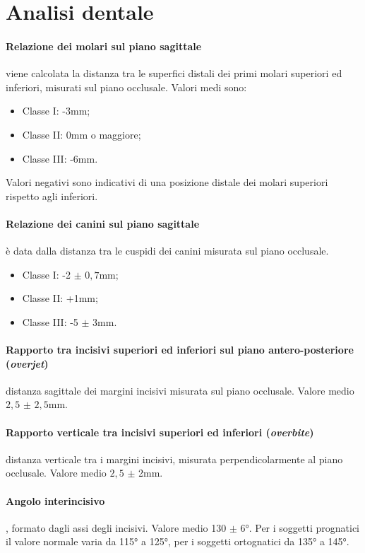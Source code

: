 \section{Analisi dentale}

\paragraph{Relazione dei molari sul piano sagittale} viene calcolata la distanza tra le superfici distali dei primi molari superiori ed inferiori, misurati sul piano occlusale. Valori medi sono:
\begin{itemize}
\item Classe I: -3mm;
\item Classe II: 0mm o maggiore;
\item Classe III: -6mm.
\end{itemize}

Valori negativi sono indicativi di una posizione distale dei molari superiori rispetto agli inferiori.

\paragraph{Relazione dei canini sul piano sagittale} è data dalla distanza tra le cuspidi dei canini misurata sul piano occlusale.
\begin{itemize}
\item Classe I: -2 $\pm$ $0,7$mm;
\item Classe II: +1mm;
\item Classe III: -5 $\pm$ 3mm.
\end{itemize}

\paragraph{Rapporto tra incisivi superiori ed inferiori sul piano antero-posteriore (\textit{overjet})} distanza sagittale dei margini incisivi misurata sul piano occlusale. Valore medio $2,5$ $\pm$ $2,5$mm.

\paragraph{Rapporto verticale tra incisivi superiori ed inferiori (\textit{overbite})} distanza verticale tra i margini incisivi, misurata perpendicolarmente al piano occlusale. Valore medio $2,5$ $\pm$ 2mm.

\paragraph{Angolo interincisivo}, formato dagli assi degli incisivi. Valore medio 130 $\pm$ 6°. Per i soggetti prognatici il valore normale varia da 115° a 125°, per i soggetti ortognatici da 135° a 145°.

